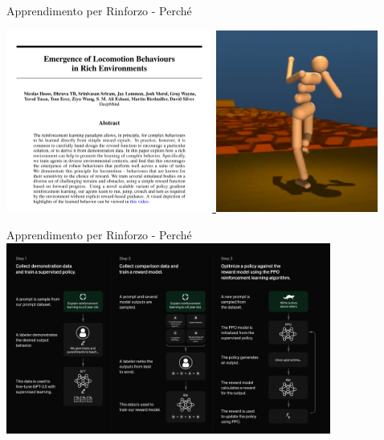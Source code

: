 \documentclass[presentation, 10pt,aspectratio=169]{beamer}\mode<presentation>{\usetheme{AMSBolognaFC}}
\begin{document}
\begin{frame}{Apprendimento per Rinforzo - Perché}
	\begin{center}
		\href{https://arxiv.org/abs/1707.02286}{
		\includegraphics[height=6cm]{img/emegence-of-motion.png}
		}
		\href{https://www.youtube.com/watch?v=hx_bgoTF7bs}{
		\includegraphics[height=6cm]{img/deep-mind-robot.png}}
	\end{center} 
\end{frame}

\begin{frame}{Apprendimento per Rinforzo - Perché} 
	\centering
	\href{https://openai.com/index/chatgpt/}{\includegraphics[width=0.8\textwidth]{img/human-feedback.png}}
\end{frame}
\end{document}
